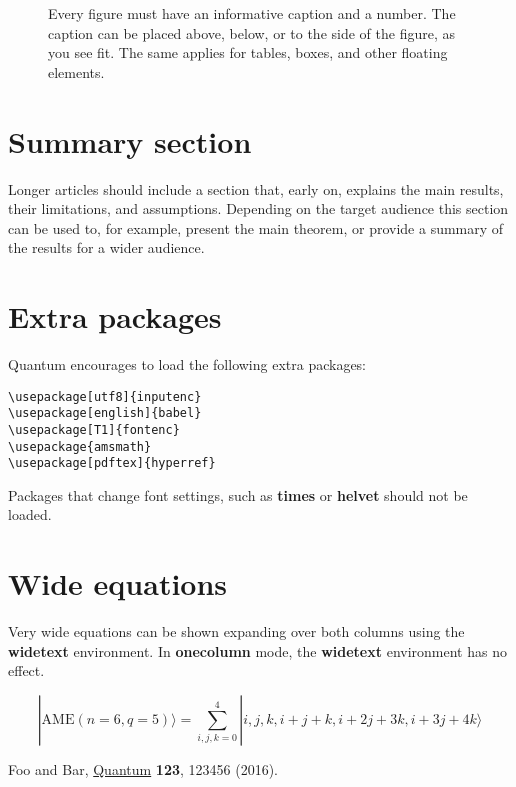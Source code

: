 \documentclass[prx,a4paper,aps,twocolumn,superscriptaddress,11pt]{quantumarticle}
\begin{document}
\begin{figure}[tb]
  \centering
  \caption{Every figure must have an informative caption and a number.
    The caption can be placed above, below, or to the side of the figure, as you see fit.
    The same applies for tables, boxes, and other floating elements.}
  \label{fig:figure1}
\end{figure}

\section{Summary section}
\label{sec:sec1}
Longer articles should include a section that, early on, explains the main results, their limitations, and assumptions.
Depending on the target audience this section can be used to, for example, present the main theorem, or provide a summary of the results for a wider audience.

\section{Extra packages}
Quantum encourages to load the following extra packages: 
\begin{verbatim}
\usepackage[utf8]{inputenc}
\usepackage[english]{babel}
\usepackage[T1]{fontenc}
\usepackage{amsmath}  
\usepackage[pdftex]{hyperref}  
\end{verbatim}
Packages that change font settings, such as \textbf{times} or \textbf{helvet} should not be loaded.

\section{Wide equations}
Very wide equations can be shown expanding over both columns using the \textbf{widetext} environment.
In \textbf{onecolumn} mode, the \textbf{widetext} environment has no effect.
\begin{widetext}
  \begin{equation}
|\mathrm{AME}(n=6,q=5)\rangle=\sum_{i,j,k=0}^4 |i,j,k,i+j+k,i+2j+3k,i+3j+4k\rangle
  \end{equation}
\end{widetext}


\begin{thebibliography}{9}
  Foo and Bar, \href{http://quantum-journal.org}{Quantum} \textbf{123}, 123456 (2016).
\end{thebibliography}
\end{document}

